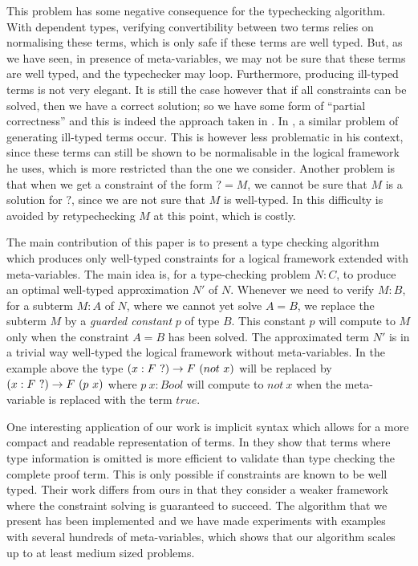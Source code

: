 This problem has some negative consequence for the typechecking algorithm. With dependent types,
verifying convertibility between two 
terms relies on normalising these terms, which is only safe if these terms are well typed. But, as we
have seen, in presence of meta-variables, we may not be sure that these terms are well typed, and the
typechecker may loop. Furthermore, producing ill-typed terms is not very elegant.
It is still the case however that if all constraints can be solved, then we have a correct solution; so we
have some form of ``partial correctness'' and this is indeed the approach taken in 
\cite{magnussonnordstrom:alf,coquand:stt-lfm99}. In \cite{elliot:unification}, a similar problem of generating
ill-typed terms occur. This is however less problematic in his context, since these terms can still be shown
to be normalisable in the logical framework he uses, which is more restricted than the one we consider.
Another problem is that when we get a constraint of the form $? = M$, we cannot be sure that $M$ is a solution
for $?$, since we are not sure that $M$ is well-typed. In \cite{magnussonnordstrom:alf,coquand:stt-lfm99,munoz:synthesis}
this difficulty is avoided by retypechecking $M$ at this point, which is costly.


 The main contribution of this paper is to present a type checking algorithm
which produces only well-typed constraints for a logical framework extended
with meta-variables. The main idea is,
for a type-checking problem $N:C$,
to produce an optimal well-typed approximation $N'$ of $N$. 
Whenever we need to verify $M:B$, for a subterm $M:A$ of $N$, where we cannot
yet solve $A=B$,
we replace the subterm $M$
by a {\em guarded constant} $p$ of type $B$. This constant $p$ will compute to $M$ only when the
constraint $A=B$ has been solved. The approximated term $N'$ is in a trivial
way well-typed the logical framework without meta-variables. In the
example above the type $(x:F ~?)\to{} {F~ (not~x)}$ will be replaced by $(x:F ~?)\to{} {F~ (p ~ x)}$ where $p~x : Bool$ will compute to $not ~ x$ when the
meta-variable is replaced with the term $true$.


One interesting application of our work is implicit syntax which allows for a
more compact and readable representation of terms. In
\cite{necula:representation} they show that terms where type information is
omitted is  more efficient to validate than type checking the complete proof
term. This is only possible if constraints are known to be well typed. Their
work differs from ours in that they consider a weaker framework where the
constraint solving is guaranteed to succeed.  The algorithm that we present has
been implemented and we have made experiments with examples with several
hundreds of meta-variables, which shows that our algorithm scales up to at
least medium sized problems.

